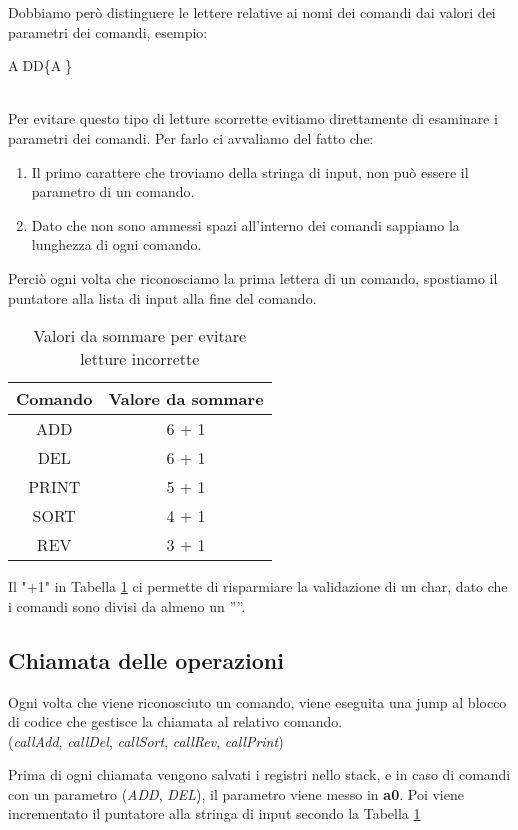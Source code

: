 Dobbiamo però distinguere le lettere relative ai nomi dei comandi dai valori dei parametri 
dei comandi, esempio:\\
\centerline{\textcircled{A}DD\{\textcircled{A}\}} \\
%
Per evitare questo tipo di letture scorrette evitiamo direttamente di esaminare i parametri
dei comandi. Per farlo ci avvaliamo del fatto che:
\begin{enumerate}
    \item Il primo carattere che troviamo della stringa di input, non può essere il 
    parametro di un comando.
    \item Dato che non sono ammessi spazi all'interno dei comandi sappiamo la lunghezza di 
    ogni comando.
\end{enumerate}
%
Perciò ogni volta che riconosciamo la prima lettera di un comando, spostiamo
il puntatore alla lista di input alla fine del comando. \\
\begin{table}[H]
\begin{center}
\begin{tabular}{|c|c|}
    \hline
    Comando & Valore da sommare \\
    \hline 
    ADD & 6 + 1 \\
    \hline
    DEL & 6 + 1 \\
    \hline
    PRINT & 5 + 1 \\
    \hline
    SORT & 4 + 1 \\
    \hline
    REV & 3 + 1 \\
    \hline
\end{tabular}
\caption{Valori da sommare per evitare 
letture incorrette}
\label{tab:valoriDaSommare}
\end{center}
\end{table}
%
Il "+1" in Tabella \ref{tab:valoriDaSommare} ci 
permette di risparmiare la validazione di un char,
dato che i comandi sono divisi da almeno un ''\texttildelow''.

\subsection{Chiamata delle operazioni}
Ogni volta che viene riconosciuto un comando, viene eseguita una jump al blocco di codice che gestisce la
chiamata al relativo comando.\\
(\textit{callAdd}, \textit{callDel}, \textit{callSort}, \textit{callRev}, \textit{callPrint})

Prima di ogni chiamata vengono salvati i registri nello stack, e in caso di comandi
con un parametro (\textit{ADD}, \textit{DEL}), il parametro viene messo in \textbf{a0}.
Poi viene incrementato il puntatore alla stringa di input secondo la Tabella \ref{tab:valoriDaSommare}
